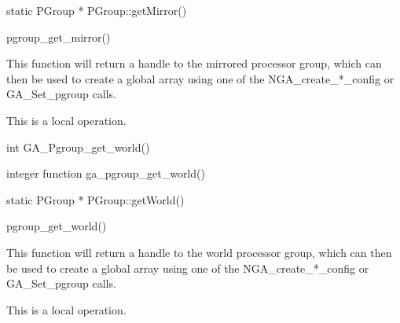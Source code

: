 \documentclass[12pt]{article}
\begin{document}
\begin{cxxapi}
\begin{cxxcode}
static PGroup * PGroup::getMirror()
\end{cxxcode}
\end{cxxapi}

\begin{pyapi}
\begin{pycode}
pgroup_get_mirror() 
\end{pycode}
\end{pyapi} 

\local
\begin{desc}

This function will return a handle to the mirrored processor group, which can then be used to create a global array using one of the NGA_create_*_config or GA_Set_pgroup calls.

This is a local operation. 
\end{desc}


\begin{capi}
\begin{ccode}
int GA_Pgroup_get_world()
\end{ccode}
\end{capi}

\begin{fapi}
\begin{fcode}
integer function ga_pgroup_get_world()
\end{fcode}
\end{fapi}

\begin{cxxapi}
\begin{cxxcode}
static PGroup * PGroup::getWorld()
\end{cxxcode}
\end{cxxapi}

\begin{pyapi}
\begin{pycode}
pgroup_get_world() 
\end{pycode}
\end{pyapi} 

\local
\begin{desc}

This function will return a handle to the world processor group, which can then be used to create a global array using one of the NGA_create_*_config or GA_Set_pgroup calls.

This is a local operation.
\end{desc}
\end{document}
